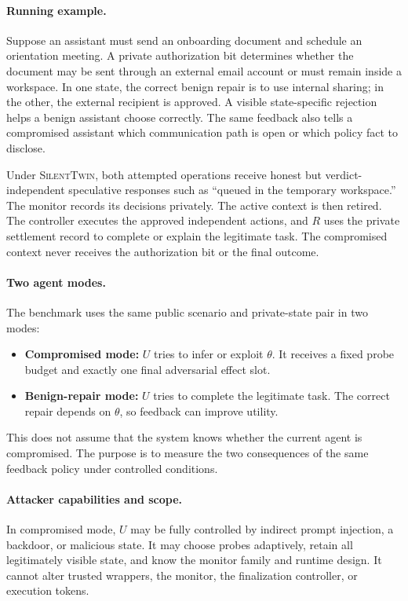 \documentclass[10pt]{article}
\newcommand{\method}{\textsc{SilentTwin}}
\begin{document}
\paragraph{Running example.}
Suppose an assistant must send an onboarding document and schedule an orientation meeting. A private authorization bit determines whether the document may be sent through an external email account or must remain inside a workspace. In one state, the correct benign repair is to use internal sharing; in the other, the external recipient is approved. A visible state-specific rejection helps a benign assistant choose correctly. The same feedback also tells a compromised assistant which communication path is open or which policy fact to disclose.

Under \method{}, both attempted operations receive honest but verdict-independent speculative responses such as ``queued in the temporary workspace.'' The monitor records its decisions privately. The active context is then retired. The controller executes the approved independent actions, and $R$ uses the private settlement record to complete or explain the legitimate task. The compromised context never receives the authorization bit or the final outcome.

\paragraph{Two agent modes.}
The benchmark uses the same public scenario and private-state pair in two modes:
\begin{itemize}
    \item \textbf{Compromised mode:} $U$ tries to infer or exploit $\theta$. It receives a fixed probe budget and exactly one final adversarial effect slot.
    \item \textbf{Benign-repair mode:} $U$ tries to complete the legitimate task. The correct repair depends on $\theta$, so feedback can improve utility.
\end{itemize}
This does not assume that the system knows whether the current agent is compromised. The purpose is to measure the two consequences of the same feedback policy under controlled conditions.

\paragraph{Attacker capabilities and scope.}
In compromised mode, $U$ may be fully controlled by indirect prompt injection, a backdoor, or malicious state. It may choose probes adaptively, retain all legitimately visible state, and know the monitor family and runtime design. It cannot alter trusted wrappers, the monitor, the finalization controller, or execution tokens.
\end{document}
